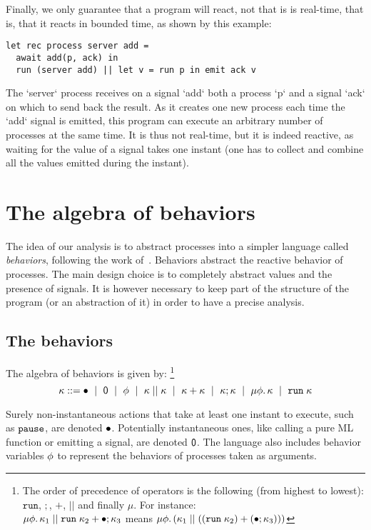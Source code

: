 \documentclass[9pt]{sigplanconf}
\newcommand{\sdeq}{::=}
\begin{document}
Finally, we only guarantee that a program will react, not that is is real-time, that is, that it reacts in bounded time, as shown by this example:
\begin{lstlisting}
let rec process server add =
  await add(p, ack) in
  run (server add) || let v = run p in emit ack v
\end{lstlisting}
%
The `server` process receives on a signal `add` both a process `p` and a signal `ack` on which to send back the result. As it creates one new process each time the `add` signal is emitted, this program can execute an arbitrary number of processes at the same time. It is thus not real-time, but it is indeed reactive, as waiting for the value of a signal takes one instant (one has to collect and combine all the values emitted during the instant).

\section{The algebra of behaviors}
\label{sec:behaviors}



The idea of our analysis is to abstract processes into a simpler language called \emph{behaviors}, following the work of~\cite{Amtoft:1999}. Behaviors abstract the reactive behavior of processes. The main design choice is to completely abstract values and the presence of signals. It is however necessary to keep part of the structure of the program (or an abstraction of it) in order to have a precise analysis.

\subsection{The behaviors}

The algebra of behaviors is given by:
\footnote{The order of precedence of operators is the following (from highest to lowest): $\mathtt{run}$, $;$, $+$, $||$ and finally $\mu$. For instance: \\
$ \mu \phi.\, \kappa_1 \mid\mid \mathtt{run}\; \kappa_2 + \bullet ; \kappa_3 $
means
$ \mu \phi.\, (\kappa_1 \mid\mid ((\mathtt{run}\; \kappa_2) + (\bullet ; \kappa_3))) $
}
%
\[
\rk \sdeq \effplus ~\mid~ \effmin ~\mid~ \effvar ~\mid~ \effpar{\rk}{\rk} ~\mid~ \effor{\rk}{\rk}
~\mid~ \effcon{\rk}{\rk}  ~\mid~ \effrec{\effvar}{\rk}  ~\mid~ \effrun{\rk}
\]

Surely non-instantaneous actions that take at least one instant to execute, such as $\mathtt{pause}$, are denoted $\bullet$. Potentially instantaneous ones, like calling a pure ML function or emitting a signal, are denoted $\textsf{0}$. The language also includes behavior variables $\phi$ to represent the behaviors of processes taken as arguments. 
\end{document}
